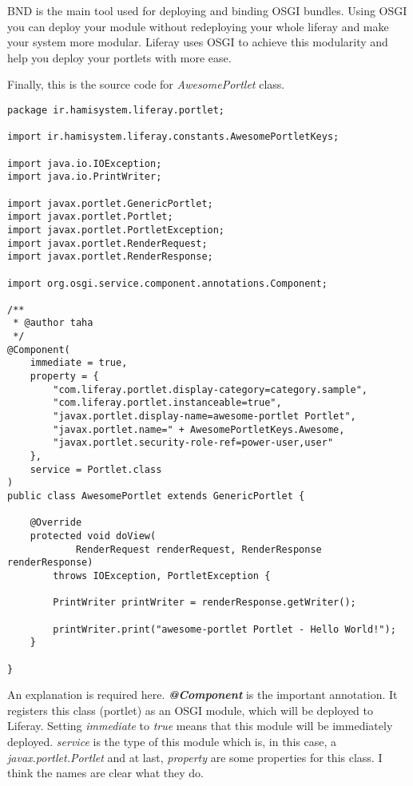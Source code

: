 BND is the main tool used for deploying and binding OSGI bundles. Using OSGI you can deploy your module without redeploying your whole liferay and make your system more modular. Liferay uses OSGI to achieve this modularity and help you deploy your portlets with more ease.

Finally, this is the source code for \textit{AwesomePortlet} class.

\lstset{language=java}
\begin{minipage}{\linewidth}
\begin{lstlisting}[caption=AwesomePortlet.java]
package ir.hamisystem.liferay.portlet;

import ir.hamisystem.liferay.constants.AwesomePortletKeys;

import java.io.IOException;
import java.io.PrintWriter;

import javax.portlet.GenericPortlet;
import javax.portlet.Portlet;
import javax.portlet.PortletException;
import javax.portlet.RenderRequest;
import javax.portlet.RenderResponse;

import org.osgi.service.component.annotations.Component;

/**
 * @author taha
 */
@Component(
	immediate = true,
	property = {
		"com.liferay.portlet.display-category=category.sample",
		"com.liferay.portlet.instanceable=true",
		"javax.portlet.display-name=awesome-portlet Portlet",
		"javax.portlet.name=" + AwesomePortletKeys.Awesome,
		"javax.portlet.security-role-ref=power-user,user"
	},
	service = Portlet.class
)
public class AwesomePortlet extends GenericPortlet {

	@Override
	protected void doView(
			RenderRequest renderRequest, RenderResponse renderResponse)
		throws IOException, PortletException {

		PrintWriter printWriter = renderResponse.getWriter();

		printWriter.print("awesome-portlet Portlet - Hello World!");
	}

}
\end{lstlisting}
\end{minipage}

An explanation is required here. \textit{\textbf{@Component}} is the important annotation. It registers this class (portlet) as an OSGI module, which will be deployed to Liferay. Setting \textit{immediate} to \textit{true} means that this module will be immediately deployed. \textit{service} is the type of this module which is, in this case, a \textit{javax.portlet.Portlet} and at last, \textit{property} are some properties for this class. I think the names are clear what they do.

